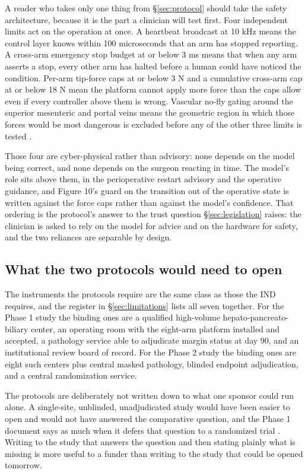 A reader who takes only one thing from \S\ref{sec:protocol} should take the
safety architecture, because it is the part a clinician will test first. Four
independent limits act on the operation at once. A heartbeat broadcast at 10 kHz
means the control layer knows within 100 microseconds that an arm has stopped
reporting. A cross-arm emergency stop budget at or below 3 ms means that when
any arm asserts a stop, every other arm has halted before a human could have
noticed the condition. Per-arm tip-force caps at or below 3 N and a cumulative
cross-arm cap at or below 18 N mean the platform cannot apply more force than
the caps allow even if every controller above them is wrong. Vascular no-fly
gating around the superior mesenteric and portal veins means the geometric
region in which those forces would be most dangerous is excluded before any of
the other three limits is tested \cite{onpremwhippl}.

Those four are cyber-physical rather than advisory: none depends on the model
being correct, and none depends on the surgeon reacting in time. The model's
role sits above them, in the perioperative restart advisory and the operative
guidance, and Figure 10's guard on the transition out of the operative state is
written against the force caps rather than against the model's confidence. That
ordering is the protocol's answer to the trust question \S\ref{sec:legislation}
raises: the clinician is asked to rely on the model for advice and on the
hardware for safety, and the two reliances are separable by design.

\subsection{What the two protocols would need to open}

The instruments the protocols require are the same class as those the IND
requires, and the register in \S\ref{sec:limitations} lists all seven together.
For the Phase 1 study the binding ones are a qualified high-volume
hepato-pancreato-biliary center, an operating room with the eight-arm platform
installed and accepted, a pathology service able to adjudicate margin status at
day 90, and an institutional review board of record. For the Phase 2 study the
binding ones are eight such centers plus central masked pathology, blinded
endpoint adjudication, and a central randomization service.

The protocols are deliberately not written down to what one sponsor could run
alone. A single-site, unblinded, unadjudicated study would have been easier to
open and would not have answered the comparative question, and the Phase 1
document says as much when it defers that question to a randomized trial
\cite{onpremwhippl, phase2proto}. Writing to the study that answers the question
and then stating plainly what is missing is more useful to a funder than writing
to the study that could be opened tomorrow.

